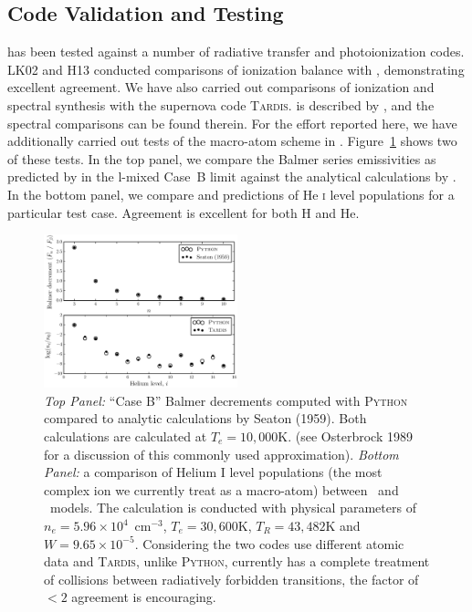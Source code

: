 \documentclass[preprint, a4paper, 11pt]{aastex}
\begin{document}
\subsection{Code Validation and Testing}

\py has been tested against a number of radiative transfer and
photoionization codes. LK02 and H13 conducted comparisons of 
ionization balance  with \cld \citep{cloudy2013}, demonstrating
excellent agreement. We have also carried out comparisons
of ionization and spectral synthesis with the supernova code
\textsc{Tardis.} \tar is described by 
\cite{kerzendorfsim}, and the spectral comparisons can be found
therein. For the effort reported here, we have additionally carried
out tests of the macro-atom scheme in \py. Figure~\ref{tests} shows
two of these tests. In the top panel, we compare the Balmer series 
emissivities as predicted by \py in the l-mixed Case~B limit against the
analytical calculations by \cite{seaton1959}. In the bottom panel, we
compare \py and \tar predictions of  He \textsc{i} level populations
for a particular test case. Agreement is excellent for both H and He.

\begin{figure}
\centering
\includegraphics[width=0.5\textwidth]{figures/fig_caseb_tardis.eps}
\caption{
{\sl Top Panel:} ``Case B'' Balmer decrements computed 
with \textsc{Python} compared to analytic calculations
by Seaton (1959). Both calculations are calculated at $T_e=10,000$K.
(see Osterbrock 1989 for a discussion of this commonly used approximation).
{\sl Bottom Panel:}  a comparison of Helium I level populations (the most complex ion we currently 
treat as a macro-atom) between \py~and \tar~models. 
The calculation is conducted with physical parameters of $n_e=5.96\times10^4$~cm$^{-3}$,
$T_e=30,600$K, $T_R=43,482$K and $W=9.65\times10^{-5}$. 
Considering the two codes use different atomic data and \textsc{Tardis,} unlike \textsc{Python,} currently has a complete treatment of collisions between 
radiatively forbidden transitions, the factor of 
$<2$ agreement is encouraging. 
}
\label{tests}
\end{figure}
\end{document}
